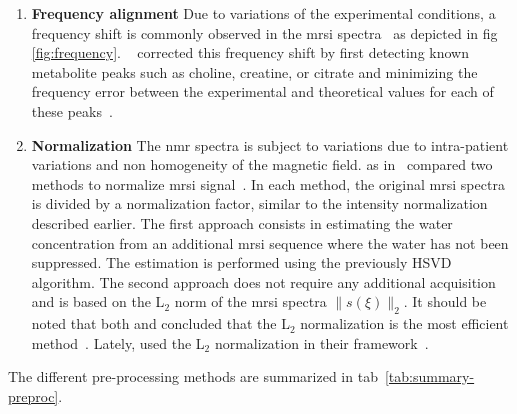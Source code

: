 \begin{enumerate}[leftmargin=*]
\item[] \textbf{Frequency alignment}
Due to variations of the experimental conditions, a frequency shift is commonly
observed in the \ac{mrsi} spectra~\cite{Chen2002,Osorio-Garcia2012} as depicted
in \acs{fig}\,\ref{fig:frequency}.
\citeauthor{Tiwari2012}~\cite{Tiwari2012} corrected this frequency shift by
first detecting known metabolite peaks such as choline, creatine, or citrate
and minimizing the frequency error between the experimental and theoretical
values for each of these peaks~\cite{Tiwari2012}.

\item[] \textbf{Normalization}
The \ac{nmr} spectra is subject to variations due to intra-patient variations
and non homogeneity of the magnetic field.
\citeauthor{Parfait2012} as in~\cite{Devos2004} compared two methods to
normalize \ac{mrsi} signal~\cite{Parfait2012}.
In each method, the original \ac{mrsi} spectra is divided by a normalization
factor, similar to the intensity normalization described earlier.
The first approach consists in estimating the water concentration from an
additional \ac{mrsi} sequence where the water has not been suppressed.
The estimation is performed using the previously HSVD algorithm.
The second approach does not require any additional acquisition and is based on
the L$_2$ norm of the \ac{mrsi} spectra $\|s(\xi)\|_2$.
It should be noted that both \citeauthor{Parfait2012} and
\citeauthor{Devos2004} concluded that the L$_2$ normalization is the most
efficient method~\cite{Parfait2012}.
Lately, \citeauthor{trigui2017automatic} used the L$_2$ normalization in their
framework~\cite{trigui2016classification,trigui2017automatic}.

\end{enumerate}

The different pre-processing methods are summarized in \acs{tab}~\ref{tab:summary-preproc}.

